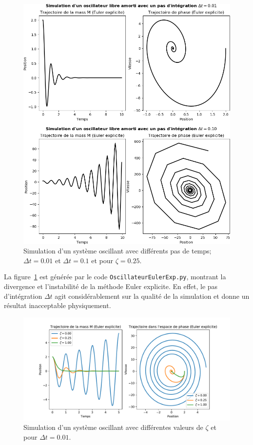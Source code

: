 \documentclass[%
oneside,                 %
final,                   %
10pt]{article}
\begin{document}
\begin{figure}[!ht]  %
  \centerline{\includegraphics[width=0.7\linewidth]{scripts/EulerExp_3.png}}
  \caption{
  Simulation d'un système oscillant avec différents pas de temps; $\Delta t = 0.01$ et $\Delta t = 0.1$ et pour $\zeta = 0.25$. \label{fig:EulerExp_3}
  }
\end{figure}


La figure~\ref{fig:EulerExp_3} est générée par le code \texttt{OscillateurEulerExp.py}, montrant la divergence et l'instabilité de la méthode Euler explicite. En effet, le pas d'intégration $\Delta t$ agit considérablement sur la qualité de la simulation et donne un résultat inacceptable physiquement.


\begin{figure}[!ht]  %
  \centerline{\includegraphics[width=0.7\linewidth]{scripts/EulerExpGen.pdf}}
  \caption{
  Simulation d'un système oscillant avec différentes valeurs de $\zeta$ et pour $\Delta t = 0.01$. \label{fig:EulerExpGen}
  }
\end{figure}
\end{document}
